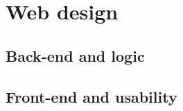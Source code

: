 \section{Web design}\label{sec:webdesign}
\subsection{Back-end and logic}\label{sec:backend}
\subsection{Front-end and usability}\label{sec:frontend}
